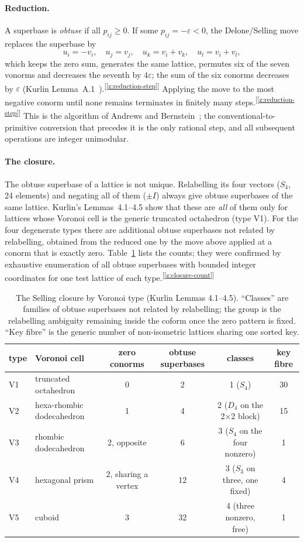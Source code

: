\documentclass[11pt]{article}
\newcommand{\chk}[1]{\textsuperscript{[\ref{#1}]}}
\begin{document}
\paragraph{Reduction.}
A superbase is \emph{obtuse} if all $p_{ij}\ge0$. If some $p_{ij}=-\varepsilon<0$, the Delone/Selling move replaces the superbase by
\[
u_i=-v_i,\quad u_j=v_j,\quad u_k=v_i+v_k,\quad u_l=v_i+v_l,
\]
which keeps the zero sum, generates the same lattice, permutes six of the seven vonorms and decreases the seventh by $4\varepsilon$; the sum of the six conorms decreases by $\varepsilon$ (Kurlin Lemma~A.1~\cite{kurlin2026}).\chk{z:reduction-step} Applying the move to the most negative conorm until none remains terminates in finitely many steps.\chk{z:reduction-step} This is the algorithm of Andrews and Bernstein~\cite{ab1988,ab2014,abs2019}; the conventional-to-primitive conversion that precedes it is the only rational step, and all subsequent operations are integer unimodular.

\paragraph{The closure.}
The obtuse superbase of a lattice is not unique. Relabelling its four vectors ($S_4$, 24 elements) and negating all of them ($\pm I$) always give obtuse superbases of the same lattice. Kurlin's Lemmas~4.1--4.5 show that these are \emph{all} of them only for lattices whose Voronoi cell is the generic truncated octahedron (type V1). For the four degenerate types there are additional obtuse superbases not related by relabelling, obtained from the reduced one by the move above applied at a conorm that is exactly zero. Table~\ref{tab:closure} lists the counts; they were confirmed by exhaustive enumeration of all obtuse superbases with bounded integer coordinates for one test lattice of each type.\chk{z:closure-count}

\begin{table}[h]
\centering
\caption{The Selling closure by Voronoi type (Kurlin Lemmas 4.1--4.5). ``Classes'' are families of obtuse superbases not related by relabelling; the group is the relabelling ambiguity remaining inside the coform once the zero pattern is fixed. ``Key fibre'' is the generic number of non-isometric lattices sharing one sorted key.}
\label{tab:closure}
\begin{tabular}{llcccc}
\toprule
type & Voronoi cell & zero conorms & obtuse superbases & classes & key fibre \\
\midrule
V1 & truncated octahedron & 0 & 2 & 1 ($S_4$) & 30 \\
V2 & hexa-rhombic dodecahedron & 1 & 4 & 2 ($D_4$ on the 2$\times$2 block) & 15 \\
V3 & rhombic dodecahedron & 2, opposite & 6 & 3 ($S_4$ on the four nonzero) & 1 \\
V4 & hexagonal prism & 2, sharing a vertex & 12 & 3 ($S_3$ on three, one fixed) & 4 \\
V5 & cuboid & 3 & 32 & 4 (three nonzero, free) & 1 \\
\bottomrule
\end{tabular}
\end{table}
\end{document}
